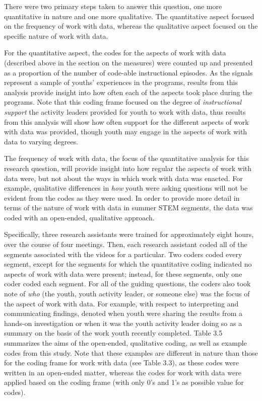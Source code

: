 \documentclass[]{book}
\theoremstyle{definition}
\theoremstyle{definition}
\theoremstyle{definition}
\theoremstyle{remark}
\begin{document}
There were two primary steps taken to answer this question, one more
quantitative in nature and one more qualitative. The quantitative aspect
focused on the frequency of work with data, whereas the qualitative
aspect focused on the specific nature of work with data.

For the quantitative aspect, the codes for the aspects of work with data
(described above in the section on the measures) were counted up and
presented as a proportion of the number of code-able instructional
episodes. As the signals represent a sample of youths' experiences in
the programs, results from this analysis provide insight into how often
each of the aspects took place during the programs. Note that this
coding frame focused on the degree of \emph{instructional support} the
activity leaders provided for youth to work with data, thus results from
this analysis will show how often support for the different aspects of
work with data was provided, though youth may engage in the aspects of
work with data to varying degrees.

The frequency of work with data, the focus of the quantitative analysis
for this research question, will provide insight into how regular the
aspects of work with data were, but not about the ways in which work
with data was enacted. For example, qualitative differences in
\emph{how} youth were asking questions will not be evident from the
codes as they were used. In order to provide more detail in terms of the
nature of work with data in summer STEM segments, the data was coded
with an open-ended, qualitative approach.

Specifically, three research assistants were trained for approximately
eight hours, over the course of four meetings. Then, each research
assistant coded all of the segments associated with the videos for a
particular. Two coders coded every segment, except for the segments for
which the quantitative coding indicated no aspects of work with data
were present; instead, for these segments, only one coder coded each
segment. For all of the guiding questions, the coders also took note of
\emph{who} (the youth, youth activity leader, or someone else) was the
focus of the aspect of work with data. For example, with respect to
interpreting and communicating findings, denoted when youth were sharing
the results from a hands-on investigation or when it was the youth
activity leader doing so as a summary on the basis of the work youth
recently completed. Table 3.5 summarizes the aims of the open-ended,
qualitative coding, as well as example codes from this study. Note that
these examples are different in nature than those for the coding frame
for work with data (see Table 3.3), as these codes were written in an
open-ended matter, whereas the codes for work with data were applied
based on the coding frame (with only 0's and 1's as possible value for
codes).
\end{document}
